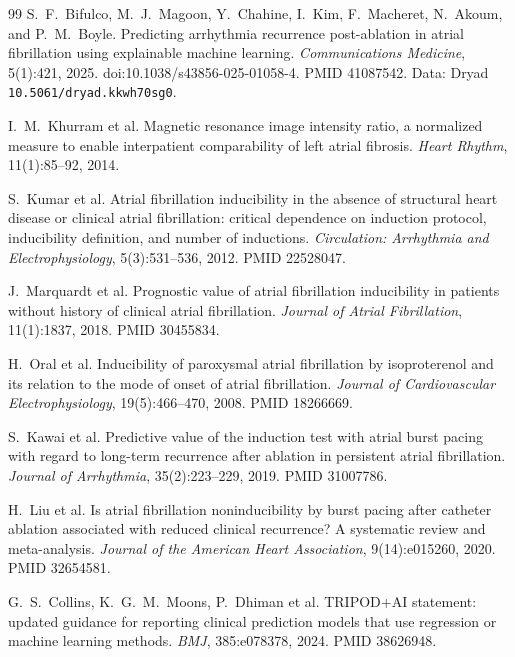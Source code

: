 \documentclass[11pt]{article}
\theoremstyle{definition}
\newcommand{\code}[1]{\texttt{#1}}
\begin{document}
\begin{thebibliography}{99}
 S.~F.~Bifulco, M.~J.~Magoon, Y.~Chahine, I.~Kim,
F.~Macheret, N.~Akoum, and P.~M.~Boyle. Predicting arrhythmia
recurrence post-ablation in atrial fibrillation using explainable machine
learning. \emph{Communications Medicine}, 5(1):421, 2025.
doi:10.1038/s43856-025-01058-4. PMID 41087542.
Data: Dryad \code{10.5061/dryad.kkwh70sg0}.

 I.~M.~Khurram et al. Magnetic resonance image intensity
ratio, a normalized measure to enable interpatient comparability of left atrial
fibrosis. \emph{Heart Rhythm}, 11(1):85--92, 2014.

 S.~Kumar et al. Atrial fibrillation inducibility in the
absence of structural heart disease or clinical atrial fibrillation: critical
dependence on induction protocol, inducibility definition, and number of
inductions. \emph{Circulation: Arrhythmia and Electrophysiology}, 5(3):531--536,
2012. PMID 22528047.

 J.~Marquardt et al. Prognostic value of atrial
fibrillation inducibility in patients without history of clinical atrial
fibrillation. \emph{Journal of Atrial Fibrillation}, 11(1):1837, 2018.
PMID 30455834.

 H.~Oral et al. Inducibility of paroxysmal atrial fibrillation
by isoproterenol and its relation to the mode of onset of atrial fibrillation.
\emph{Journal of Cardiovascular Electrophysiology}, 19(5):466--470, 2008.
PMID 18266669.

 S.~Kawai et al. Predictive value of the induction test with
atrial burst pacing with regard to long-term recurrence after ablation in
persistent atrial fibrillation. \emph{Journal of Arrhythmia}, 35(2):223--229,
2019. PMID 31007786.

 H.~Liu et al. Is atrial fibrillation noninducibility by burst
pacing after catheter ablation associated with reduced clinical recurrence? A
systematic review and meta-analysis. \emph{Journal of the American Heart
Association}, 9(14):e015260, 2020. PMID 32654581.

 G.~S.~Collins, K.~G.~M.~Moons, P.~Dhiman et al.
TRIPOD+AI statement: updated guidance for reporting clinical prediction models
that use regression or machine learning methods. \emph{BMJ}, 385:e078378, 2024.
PMID 38626948.
\end{thebibliography}
\end{document}
